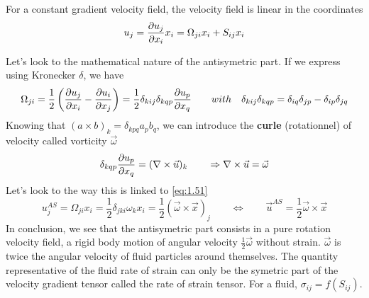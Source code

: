 		For a constant gradient velocity field, the velocity field is linear in the coordinates
		\begin{equation}
			u_j = \frac{\D u_j}{\D x_i}x_i = \Omega _{ji} x_i + S _{ij} x_i
			\label{eq:1.51}
		\end{equation}
		
		Let's look to the mathematical nature of the antisymetric part.  If we express using Kronecker $\delta$, we have
		\begin{equation}
			\Omega _{ji} =\frac{1}{2} \left( \frac{\D u_j}{\D x_i} - \frac{\D u_i}{\D x_j} \right) = \frac{1}{2} \delta _{kij}\delta _{kqp} \frac{\D u_p}{\D x_q} \qquad 
			with \quad \delta _{kij}\delta _{kqp} = \delta _{iq}\delta _{jp} - \delta _{ip}\delta _{jq} 
		\end{equation}
		Knowing that $(a \times b)_k = \delta _{kpq} a_p b_q$, we can introduce the \textbf{curle} (rotationnel) of velocity called vorticity $\vec{\omega}$
		\begin{equation}
			\delta _{kqp} \frac{\D u_p}{\D x_q} = (\nabla \times \vec{u})_k \qquad \Rightarrow \nabla \times \vec{u} = \vec{\omega}
		\end{equation}		 
		Let's look to the way this is linked to \eqref{eq:1.51}
		\begin{equation}
			 u_j^{AS} = \Omega _{ji}x_i = \frac{1}{2} \delta _{jki} \omega _k x_i = \frac{1}{2} (\vec{\omega} \times \vec{x})_j
			\qquad \Leftrightarrow \qquad 
			\vec{u}^{AS} = \frac{1}{2} \vec{\omega}\times \vec{x}
		\end{equation}
	 	In conclusion, we see that the antisymetric part consists in a pure rotation velocity field, a rigid body motion of angular velocity $\frac{1}{2}\vec{\omega}$ without strain. $\vec{\omega}$ is twice the angular velocity of fluid particles around themselves. The quantity representative of the fluid rate of strain can only be the symetric part of the velocity gradient tensor called the rate of strain tensor. For a fluid, $\sigma _{ij} = f(S_{ij})$. \\
	 	

